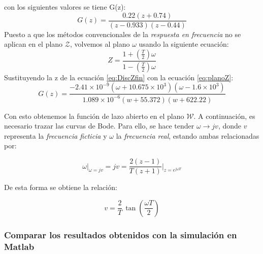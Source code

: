con los siguientes valores se tiene G(z):
\begin{equation}
	G(z) = \frac{0.22(z+0.74)}{(z-0.933)(z-0.44)}
	\label{eq:DiscZfin}
\end{equation}
Puesto a que los métodos convencionales de la \emph{respuesta en frecuencia} no se aplican en el plano $\mathcal{Z}$, volvemos al plano $\omega$ usando la siguiente ecuación:
\begin{equation}
	Z = \frac{1+(\frac{T}{2})\omega}{1-(\frac{T}{2})\omega}
	\label{eq:planoZ}
\end{equation}
Sustituyendo la z de la ecuación \ref{eq:DiscZfin} con la ecuación \ref{eq:planoZ}:
\begin{equation}
	G(z) = \frac{-2.41 \times 10^{-9} (\omega +10.675 \times 10^{3})(\omega - 1.6 \times 10^{3})}{1.089 \times 10^{-6} (w + 55.372)(w + 622.22)}
\end{equation}

Con esto obtenemos la función de lazo abierto en el plano $\mathcal{W}$.  
A continuación, es necesario trazar las curvas de Bode. Para ello, se hace tender $\omega \rightarrow jv$, donde $v$ representa la \emph{frecuencia ficticia} y $\omega$ la \emph{frecuencia real}, estando ambas relacionadas por:

\begin{equation}
	\omega \big|_{\omega = jv} = jv = \frac{2(z-1)}{T(z+1)}\bigg|_{z = e^{j\omega T}}
	\label{Relavw}
\end{equation}

De esta forma se obtiene la relación:

\begin{equation}
	v = \frac{2}{T}\,\tan\!\left(\frac{\omega T}{2}\right)
\end{equation}

\subsubsection{Comparar los resultados obtenidos con la simulación en Matlab}
